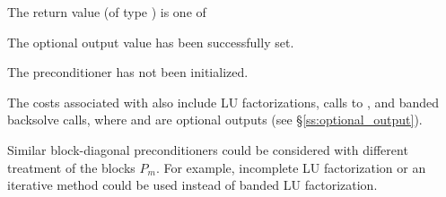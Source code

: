 {
  The return value  (of type ) is one of
  \begin{args}
  \item[\Id{CV\_SUCCESS}] 
    The optional output value has been successfully set.
  \item[\Id{CV\_PDATA\_NULL}]
    The {\cvbbdpre} preconditioner has not been initialized.
  \end{args}
}
{}

The costs associated with {\cvbbdpre} also include  LU
factorizations,  calls to , and  banded
backsolve calls, where  and  are optional {\cvode}
outputs (see \S\ref{ss:optional_output}).

Similar block-diagonal preconditioners could be considered with different
treatment of the blocks $P_m$. For example, incomplete LU factorization or
an iterative method could be used instead of banded LU factorization.
